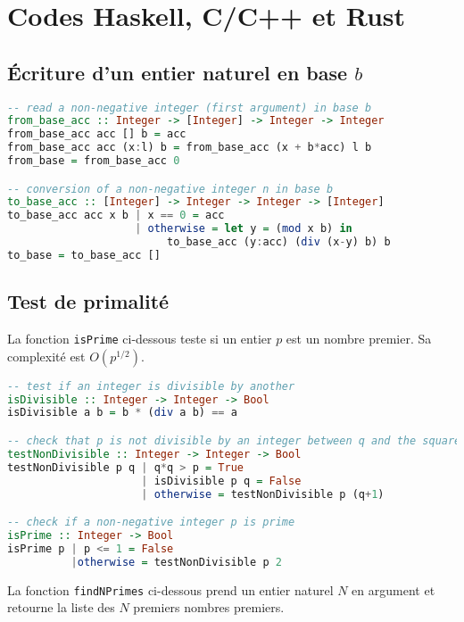 \section{Codes Haskell, C/C++ et Rust}

\subsection{Écriture d'un entier naturel en base \texorpdfstring{$b$}{b}}
\label{app:Haskell_baseb}

\begin{lstlisting}[language=Haskell]
-- read a non-negative integer (first argument) in base b
from_base_acc :: Integer -> [Integer] -> Integer -> Integer
from_base_acc acc [] b = acc
from_base_acc acc (x:l) b = from_base_acc (x + b*acc) l b 
from_base = from_base_acc 0

-- conversion of a non-negative integer n in base b
to_base_acc :: [Integer] -> Integer -> Integer -> [Integer]
to_base_acc acc x b | x == 0 = acc
                    | otherwise = let y = (mod x b) in 
                         to_base_acc (y:acc) (div (x-y) b) b
to_base = to_base_acc []
\end{lstlisting}

\subsection{Test de primalité}
\label{app:Haskell_primalité}

\noindent 
La fonction \texttt{isPrime} ci-dessous teste si un entier $p$ est un nombre premier. 
Sa complexité est $O \left( p^{1/2} \right)$.

\begin{lstlisting}[language=Haskell]
-- test if an integer is divisible by another
isDivisible :: Integer -> Integer -> Bool
isDivisible a b = b * (div a b) == a

-- check that p is not divisible by an integer between q and the square root of p
testNonDivisible :: Integer -> Integer -> Bool
testNonDivisible p q | q*q > p = True
                     | isDivisible p q = False
                     | otherwise = testNonDivisible p (q+1)

-- check if a non-negative integer p is prime
isPrime :: Integer -> Bool
isPrime p | p <= 1 = False
          |otherwise = testNonDivisible p 2
\end{lstlisting}

\noindent
La fonction \texttt{findNPrimes} ci-dessous prend un entier naturel $N$ en argument et retourne la liste des $N$ premiers nombres premiers. 


